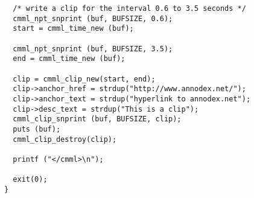 \begin{verbatim}
  /* write a clip for the interval 0.6 to 3.5 seconds */
  cmml_npt_snprint (buf, BUFSIZE, 0.6);
  start = cmml_time_new (buf);

  cmml_npt_snprint (buf, BUFSIZE, 3.5);
  end = cmml_time_new (buf);

  clip = cmml_clip_new(start, end);
  clip->anchor_href = strdup("http://www.annodex.net/");
  clip->anchor_text = strdup("hyperlink to annodex.net");
  clip->desc_text = strdup("This is a clip");
  cmml_clip_snprint (buf, BUFSIZE, clip);
  puts (buf);
  cmml_clip_destroy(clip);

  printf ("</cmml>\n");

  exit(0);
}
\end{verbatim}
\normalsize
 